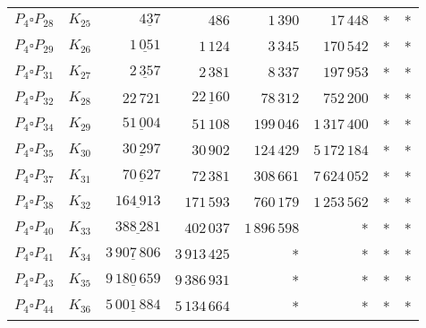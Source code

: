 \begin{tabular}{ccrrrrrr}
$P_4\square P_{28}$ & $K_{25}$ & $\underline{437}$ & $486$ & $1\,390$ & $17\,448$ & * & *\\
$P_4\square P_{29}$ & $K_{26}$ & $\underline{1\,051}$ & $1\,124$ & $3\,345$ & $170\,542$ & * & *\\
$P_4\square P_{31}$ & $K_{27}$ & $\underline{2\,357}$ & $2\,381$ & $8\,337$ & $197\,953$ & * & *\\
$P_4\square P_{32}$ & $K_{28}$ & $22\,721$ & $\underline{22\,160}$ & $78\,312$ & $752\,200$ & * & *\\
$P_4\square P_{34}$ & $K_{29}$ & $\underline{51\,004}$ & $51\,108$ & $199\,046$ & $1\,317\,400$ & * & *\\
$P_4\square P_{35}$ & $K_{30}$ & $\underline{30\,297}$ & $30\,902$ & $124\,429$ & $5\,172\,184$ & * & *\\
$P_4\square P_{37}$ & $K_{31}$ & $\underline{70\,627}$ & $72\,381$ & $308\,661$ & $7\,624\,052$ & * & *\\
$P_4\square P_{38}$ & $K_{32}$ & $\underline{164\,913}$ & $171\,593$ & $760\,179$ & $1\,253\,562$ & * & *\\
$P_4\square P_{40}$ & $K_{33}$ & $\underline{388\,281}$ & $402\,037$ & $1\,896\,598$ & * & * & *\\
$P_4\square P_{41}$ & $K_{34}$ & $\underline{3\,907\,806}$ & $3\,913\,425$ & * & * & * & *\\
$P_4\square P_{43}$ & $K_{35}$ & $\underline{9\,180\,659}$ & $9\,386\,931$ & * & * & * & *\\
$P_4\square P_{44}$ & $K_{36}$ & $\underline{5\,001\,884}$ & $5\,134\,664$ & * & * & * & *\\

    \bottomrule
\end{tabular}

